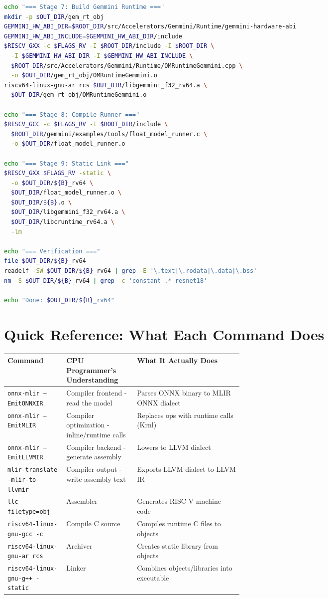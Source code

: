 \documentclass[12pt,a4paper]{article}
\begin{document}
\begin{lstlisting}[language=bash, caption=Full Pipeline Script]
echo "=== Stage 7: Build Gemmini Runtime ==="
mkdir -p $OUT_DIR/gem_rt_obj
GEMMINI_HW_ABI_DIR=$ROOT_DIR/src/Accelerators/Gemmini/Runtime/gemmini-hardware-abi
GEMMINI_HW_ABI_INCLUDE=$GEMMINI_HW_ABI_DIR/include
$RISCV_GXX -c $FLAGS_RV -I $ROOT_DIR/include -I $ROOT_DIR \
  -I $GEMMINI_HW_ABI_DIR -I $GEMMINI_HW_ABI_INCLUDE \
  $ROOT_DIR/src/Accelerators/Gemmini/Runtime/OMRuntimeGemmini.cpp \
  -o $OUT_DIR/gem_rt_obj/OMRuntimeGemmini.o
riscv64-linux-gnu-ar rcs $OUT_DIR/libgemmini_f32_rv64.a \
  $OUT_DIR/gem_rt_obj/OMRuntimeGemmini.o

echo "=== Stage 8: Compile Runner ==="
$RISCV_GCC -c $FLAGS_RV -I $ROOT_DIR/include \
  $ROOT_DIR/gemmini/examples/tools/float_model_runner.c \
  -o $OUT_DIR/float_model_runner.o

echo "=== Stage 9: Static Link ==="
$RISCV_GXX $FLAGS_RV -static \
  -o $OUT_DIR/${B}_rv64 \
  $OUT_DIR/float_model_runner.o \
  $OUT_DIR/${B}.o \
  $OUT_DIR/libgemmini_f32_rv64.a \
  $OUT_DIR/libcruntime_rv64.a \
  -lm

echo "=== Verification ==="
file $OUT_DIR/${B}_rv64
readelf -SW $OUT_DIR/${B}_rv64 | grep -E '\.text|\.rodata|\.data|\.bss'
nm -S $OUT_DIR/${B}_rv64 | grep -c 'constant_.*_resnet18'

echo "Done: $OUT_DIR/${B}_rv64"
\end{lstlisting}

\section{Quick Reference: What Each Command Does}

\begin{table}[H]
\centering
\small
\begin{tabularx}{\linewidth}{@{}L{0.25\linewidth}L{0.30\linewidth}Y@{}}
\toprule
\textbf{Command} & \textbf{CPU Programmer's Understanding} & \textbf{What It Actually Does} \\
\midrule
\texttt{onnx-mlir --EmitONNXIR} & Compiler frontend - read the model & Parses ONNX binary to MLIR ONNX dialect \\
\texttt{onnx-mlir --EmitMLIR} & Compiler optimization - inline/runtime calls & Replaces ops with runtime calls (Krnl) \\
\texttt{onnx-mlir --EmitLLVMIR} & Compiler backend - generate assembly & Lowers to LLVM dialect \\
\texttt{mlir-translate --mlir-to-llvmir} & Compiler output - write assembly text & Exports LLVM dialect to LLVM IR \\
\texttt{llc -filetype=obj} & Assembler & Generates RISC-V machine code \\
\texttt{riscv64-linux-gnu-gcc -c} & Compile C source & Compiles runtime C files to objects \\
\texttt{riscv64-linux-gnu-ar rcs} & Archiver & Creates static library from objects \\
\texttt{riscv64-linux-gnu-g++ -static} & Linker & Combines objects/libraries into executable \\
\bottomrule
\end{tabularx}
\end{table}
\end{document}
